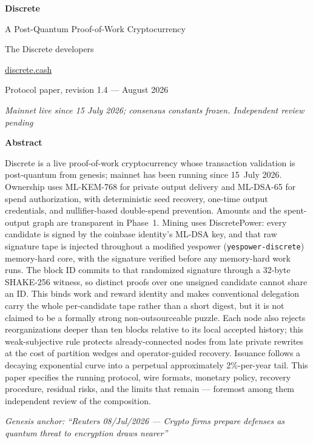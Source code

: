 \documentclass[11pt,a4paper]{article}
\newcommand{\code}[1]{\texttt{\small #1}}
\begin{document}
\begin{titlepage}
\centering
\vspace*{1.0cm}
{\Huge\bfseries Discrete\par}
\vspace{0.3cm}
{\LARGE A Post-Quantum Proof-of-Work Cryptocurrency\par}
\vspace{0.6cm}
{\large The Discrete developers\par}
\vspace{0.15cm}
{\large \href{https://discrete.cash}{discrete.cash}\par}
\vspace{0.7cm}
{\normalsize Protocol paper, revision 1.4 --- August 2026\par}
{\normalsize\itshape Mainnet live since 15 July 2026; consensus constants frozen. Independent review pending\par}
\vspace{0.7cm}

\begin{minipage}{0.86\textwidth}
\small
\begin{center}\textbf{Abstract}\end{center}
\noindent
Discrete is a live proof-of-work cryptocurrency whose transaction
validation is post-quantum from genesis; mainnet has been running since
15~July 2026. Ownership uses ML-KEM-768 for private
output delivery and ML-DSA-65 for spend authorization, with deterministic seed
recovery, one-time output credentials, and nullifier-based double-spend
prevention. Amounts and the spent-output graph are transparent in Phase~1.
Mining uses DiscretePower: every candidate is signed by the coinbase
identity's ML-DSA key, and that raw signature tape is injected throughout a
modified yespower (\code{yespower-discrete}) memory-hard core, with the signature
verified before any memory-hard work runs.
The block ID commits to that randomized signature through a 32-byte SHAKE-256
witness, so distinct proofs over one unsigned candidate cannot share an ID.
This binds work and reward identity and makes conventional delegation carry the
whole per-candidate tape rather than a short digest, but it is not claimed to be a
formally strong non-outsourceable puzzle. Each
node also rejects reorganizations deeper than ten blocks relative to its local
accepted history; this weak-subjective rule protects already-connected nodes
from late private rewrites at the cost of partition wedges and operator-guided
recovery. Issuance follows a decaying exponential curve into a perpetual
approximately 2\%-per-year tail. This paper specifies the running protocol,
wire formats, monetary policy, recovery procedure, residual risks, and the
limits that remain --- foremost among them independent review of the
composition.
\end{minipage}

\vfill
{\small\itshape Genesis anchor: ``Reuters 08/Jul/2026 --- Crypto firms prepare
defenses as quantum threat to encryption draws nearer''\par}
\vspace{0.6cm}
\end{titlepage}
\end{document}
